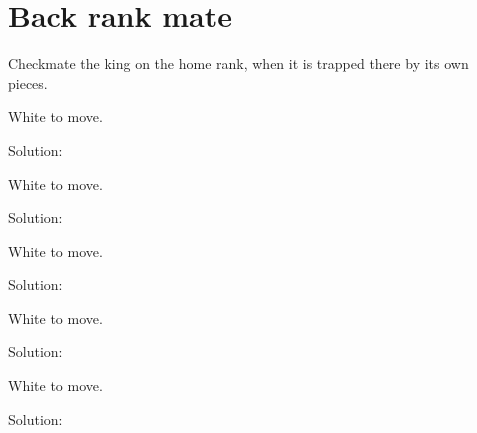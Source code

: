 \documentclass{book}
\begin{document}
\section{Back rank mate}
Checkmate the king on the home rank, when it is trapped there by its own pieces.\begin{multicols}{2} 
\begin{samepage} 
\newgame 


 
\showboard
 
 White to move. 
 
Solution: 
 
\end{samepage}\begin{samepage} 
\newgame 


 
\showboard
 
 White to move. 
 
Solution: 
 
\end{samepage}\begin{samepage} 
\newgame 


 
\showboard
 
 White to move. 
 
Solution: 
 
\end{samepage}\begin{samepage} 
\newgame 


 
\showboard
 
 White to move. 
 
Solution: 
 
\end{samepage}\begin{samepage} 
\newgame 


 
\showboard
 
 White to move. 
 
Solution: 
 
\end{samepage}\begin{samepage} 
\newgame 


\end{samepage}
\end{multicols}
\end{document}
